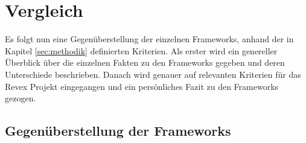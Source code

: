 \chapter{Vergleich}
\label{sec:comparison}
Es folgt nun eine Gegenüberstellung der einzelnen Frameworks, anhand der in Kapitel \ref{sec:methodik} definierten Kriterien. Als erster wird ein genereller Überblick über die einzelnen Fakten zu den Frameworks gegeben und deren Unterschiede beschrieben. Danach wird genauer auf relevanten Kriterien für das Revex Projekt eingegangen und ein persönliches Fazit zu den Frameworks gezogen.

\section{Gegenüberstellung der Frameworks}

